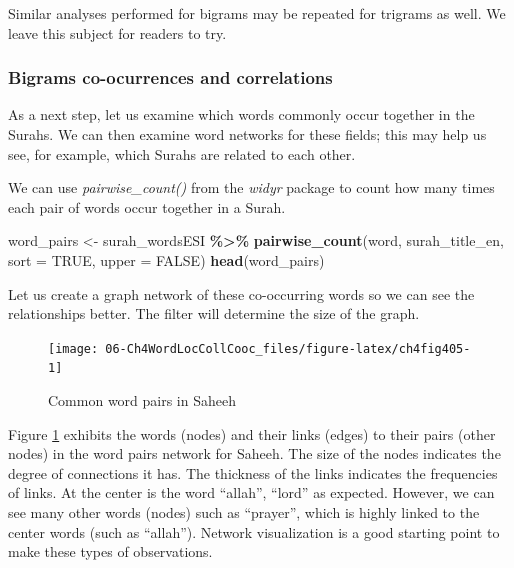 \documentclass[
]{article}
\newenvironment{Shaded}{\begin{snugshade}}{\end{snugshade}}
\newcommand{\AttributeTok}[1]{\textcolor[rgb]{0.13,0.29,0.53}{#1}}
\newcommand{\ConstantTok}[1]{\textcolor[rgb]{0.56,0.35,0.01}{#1}}
\newcommand{\FunctionTok}[1]{\textcolor[rgb]{0.13,0.29,0.53}{\textbf{#1}}}
\newcommand{\NormalTok}[1]{#1}
\newcommand{\OtherTok}[1]{\textcolor[rgb]{0.56,0.35,0.01}{#1}}
\newcommand{\SpecialCharTok}[1]{\textcolor[rgb]{0.81,0.36,0.00}{\textbf{#1}}}
\begin{document}
\normalsize

Similar analyses performed for bigrams may be repeated for trigrams as well. We leave this subject for readers to try.

\hypertarget{bigrams-co-ocurrences-and-correlations}{%
\subsubsection{Bigrams co-ocurrences and correlations}\label{bigrams-co-ocurrences-and-correlations}}

As a next step, let us examine which words commonly occur together in the Surahs. We can then examine word networks for these fields; this may help us see, for example, which Surahs are related to each other.

We can use \emph{pairwise\_count()} from the \emph{widyr} package to count how many times each pair of words occur together in a Surah.

\footnotesize

\begin{Shaded}
\begin{Highlighting}[]
\NormalTok{word\_pairs }\OtherTok{\textless{}{-}}\NormalTok{ surah\_wordsESI }\SpecialCharTok{\%\textgreater{}\%} 
  \FunctionTok{pairwise\_count}\NormalTok{(word, surah\_title\_en, }\AttributeTok{sort =} \ConstantTok{TRUE}\NormalTok{, }\AttributeTok{upper =} \ConstantTok{FALSE}\NormalTok{)}
\FunctionTok{head}\NormalTok{(word\_pairs)}
\end{Highlighting}
\end{Shaded}

\normalsize

Let us create a graph network of these co-occurring words so we can see the relationships better. The filter will determine the size of the graph.

\begin{figure}

{\centering \texttt{[image: 06-Ch4WordLocCollCooc\_files/figure-latex/ch4fig405-1]} 

}

\caption{Common word pairs in Saheeh}\label{fig:ch4fig405}
\end{figure}

Figure \ref{fig:ch4fig405} exhibits the words (nodes) and their links (edges) to their pairs (other nodes) in the word pairs network for Saheeh. The size of the nodes indicates the degree of connections it has. The thickness of the links indicates the frequencies of links. At the center is the word ``allah'', ``lord'' as expected. However, we can see many other words (nodes) such as ``prayer'', which is highly linked to the center words (such as ``allah''). Network visualization is a good starting point to make these types of observations.
\end{document}

